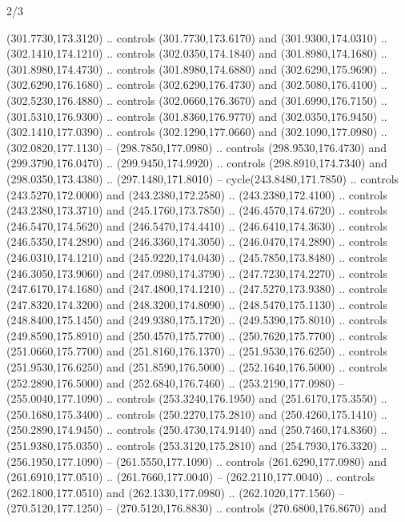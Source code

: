 \begin{flagdescription}{2/3}
\begin{scope}[xshift=0.5\flaglength,yshift=0.5\flagwidth,scale=\flagwidth/259.2]
\begin{scope}[y=0.8pt, x=0.8pt, yscale=-1,shift={(-243,-162)}]
      (301.7730,173.3120) .. controls (301.7730,173.6170) and (301.9300,174.0310) ..
      (302.1410,174.1210) .. controls (302.0350,174.1840) and (301.8980,174.1680) ..
      (301.8980,174.4730) .. controls (301.8980,174.6880) and (302.6290,175.9690) ..
      (302.6290,176.1680) .. controls (302.6290,176.4730) and (302.5080,176.4100) ..
      (302.5230,176.4880) .. controls (302.0660,176.3670) and (301.6990,176.7150) ..
      (301.5310,176.9300) .. controls (301.8360,176.9770) and (302.0350,176.9450) ..
      (302.1410,177.0390) .. controls (302.1290,177.0660) and (302.1090,177.0980) ..
      (302.0820,177.1130) -- (298.7850,177.0980) .. controls (298.9530,176.4730) and
      (299.3790,176.0470) .. (299.9450,174.9920) .. controls (298.8910,174.7340) and
      (298.0350,173.4380) .. (297.1480,171.8010) -- cycle(243.8480,171.7850) ..
      controls (243.5270,172.0000) and (243.2380,172.2580) .. (243.2380,172.4100) ..
      controls (243.2380,173.3710) and (245.1760,173.7850) .. (246.4570,174.6720) ..
      controls (246.5470,174.5620) and (246.5470,174.4410) .. (246.6410,174.3630) ..
      controls (246.5350,174.2890) and (246.3360,174.3050) .. (246.0470,174.2890) ..
      controls (246.0310,174.1210) and (245.9220,174.0430) .. (245.7850,173.8480) ..
      controls (246.3050,173.9060) and (247.0980,174.3790) .. (247.7230,174.2270) ..
      controls (247.6170,174.1680) and (247.4800,174.1210) .. (247.5270,173.9380) ..
      controls (247.8320,174.3200) and (248.3200,174.8090) .. (248.5470,175.1130) ..
      controls (248.8400,175.1450) and (249.9380,175.1720) .. (249.5390,175.8010) ..
      controls (249.8590,175.8910) and (250.4570,175.7700) .. (250.7620,175.7700) ..
      controls (251.0660,175.7700) and (251.8160,176.1370) .. (251.9530,176.6250) ..
      controls (251.9530,176.6250) and (251.8590,176.5000) .. (252.1640,176.5000) ..
      controls (252.2890,176.5000) and (252.6840,176.7460) .. (253.2190,177.0980) --
      (255.0040,177.1090) .. controls (253.3240,176.1950) and (251.6170,175.3550) ..
      (250.1680,175.3400) .. controls (250.2270,175.2810) and (250.4260,175.1410) ..
      (250.2890,174.9450) .. controls (250.4730,174.9140) and (250.7460,174.8360) ..
      (251.9380,175.0350) .. controls (253.3120,175.2810) and (254.7930,176.3320) ..
      (256.1950,177.1090) -- (261.5550,177.1090) .. controls (261.6290,177.0980) and
      (261.6910,177.0510) .. (261.7660,177.0040) -- (262.2110,177.0040) .. controls
      (262.1800,177.0510) and (262.1330,177.0980) .. (262.1020,177.1560) --
      (270.5120,177.1250) -- (270.5120,176.8830) .. controls (270.6800,176.8670) and

\end{scope}
\end{scope}
\end{flagdescription}
